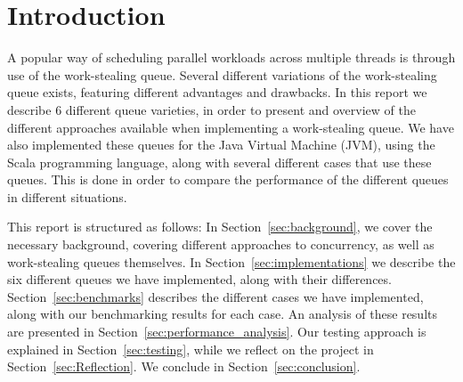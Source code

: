 \section{Introduction}
\label{sec:introduction}
A popular way of scheduling parallel workloads across multiple threads is through use of the work-stealing queue. 
Several different variations of the work-stealing queue exists, featuring different advantages and drawbacks.
In this report we describe 6 different queue varieties, in order to present and overview of the different approaches available when implementing a work-stealing queue.
We have also implemented these queues for the Java Virtual Machine (JVM), using the Scala programming language, along with several different cases that use these queues.
This is done in order to compare the performance of the different queues in different situations. 

This report is structured as follows: In Section~\ref{sec:background}, we cover
the necessary background, covering different approaches to concurrency, as well
as work-stealing queues themselves. In Section~\ref{sec:implementations} we
describe the six different queues we have implemented, along with their
differences. Section~\ref{sec:benchmarks} describes the different cases we have
implemented, along with our benchmarking results for each case. An analysis of
these results are presented in Section~\ref{sec:performance_analysis}. Our
testing approach is explained in Section~\ref{sec:testing}, while we reflect
on the project in Section~\ref{sec:Reflection}. We conclude in 
Section~\ref{sec:conclusion}.
